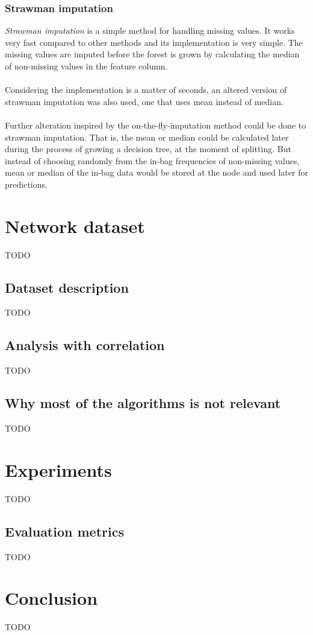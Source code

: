 \documentclass[11pt]{article}
\begin{document}
      \subsubsection{Strawman imputation}
        {\it Strawman imputation} \citep{otfi} is a simple method for handling missing values. It works very fast compared to other methods and its implementation is very simple. The missing values are imputed before the forest is grown by calculating the median of non-missing values in the feature column.
        \\~\\
        Considering the implementation is a matter of seconds, an altered version of strawman imputation was also used, one that uses mean instead of median.
        \\~\\
        Further alteration inspired by the on-the-fly-imputation method could be done to strawman imputation. That is, the mean or median could be calculated later during the process of growing a decision tree, at the moment of splitting. But instead of choosing randomly from the in-bag frequencies of non-missing values, mean or median of the in-bag data would be stored at the node and used later for predictions.
  \section{Network dataset}
    {\color{red}TODO}
    \subsection{Dataset description}
      {\color{red}TODO}
    \subsection{Analysis with correlation}
      {\color{red}TODO}
    \subsection{Why most of the algorithms is not relevant}
      {\color{red}TODO}
  \newpage
  \section{Experiments}
    {\color{red}TODO}
    \subsection{Evaluation metrics}
      {\color{red}TODO}
  \newpage
  \section*{Conclusion}
    {\color{red}TODO}
  \newpage
  
\end{document}
